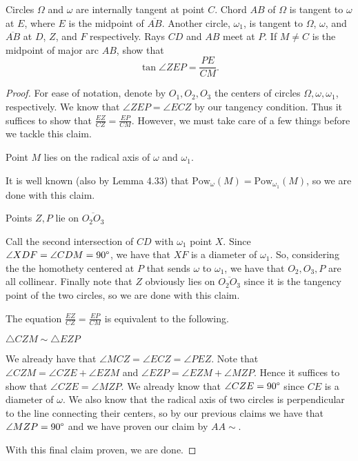 \documentclass[letterpaper,oneside]{scrartcl}
\providecommand{\ol}{\overline}
\begin{document}
\begin{problem*}
  Circles $\Omega$ and $\omega$ are internally tangent at point $C$. Chord $AB$ of $\Omega$ is tangent to $\omega$ at $E$, where $E$ is the midpoint of $\overline{AB}$. Another circle, $\omega_1$, is tangent to $\Omega$, $\omega$, and $\overline{AB}$ at $D$, $Z$, and $F$ respectively. Rays $CD$ and $AB$ meet at $P$. If $M\ne C$ is the midpoint of major arc $AB$, show that$$\tan\angle ZEP=\frac{PE}{CM}.$$
\end{problem*}
\newpage
\begin{proof}
  For ease of notation, denote by \(O_1,O_2,O_3\) the centers of circles \(\Omega,\omega,\omega_1\), respectively. We know that \(\angle ZEP = \angle ECZ\) by our tangency condition. Thus it suffices to show that \(\frac{EZ}{CZ} = \frac{EP}{CM}\). However, we must take care of a few things before we tackle this claim.
  \begin{claim*}
    Point \(M\) lies on the radical axis of \(\omega\) and \(\omega_1\).
  \end{claim*}
  \begin{subproof}
    It is well known (also by Lemma 4.33) that \(\text{Pow}_\omega(M) = \text{Pow}_{\omega_1}(M)\), so we are done with this claim.
  \end{subproof}
  \begin{claim*}
    Points \(Z,P\) lie on \(\ol{O_2O_3}\)
  \end{claim*}
  \begin{subproof}
    Call the second intersection of \(CD\) with \(\omega_1\) point \(X\). Since \(\angle XDF = \angle CDM = 90\degree\), we have that \(XF\) is a diameter of \(\omega_1\). So, considering the the homothety centered at \(P\) that sends \(\omega\) to \(\omega_1\), we have that \(O_2,O_3,P\) are all collinear. Finally note that \(Z\) obviously lies on \(\ol{O_2O_3}\) since it is the tangency point of the two circles, so we are done with this claim.
  \end{subproof}
  The equation \(\frac{EZ}{CZ} = \frac{EP}{CM}\) is equivalent to the following.
  \begin{claim*}
    \(\triangle CZM \sim \triangle EZP\)
  \end{claim*}
  \begin{subproof}
    We already have that \(\angle MCZ = \angle ECZ = \angle PEZ\). Note that \(\angle CZM = \angle CZE + \angle EZM\) and \(\angle EZP = \angle EZM + \angle MZP\). Hence it suffices to show that \(\angle CZE = \angle MZP\). We already know that \(\angle CZE = 90\degree\) since \(CE\) is a diameter of \(\omega\). We also know that the radical axis of two circles is perpendicular to the line connecting their centers, so by our previous claims we have that \(\angle MZP = 90\degree\) and we have proven our claim by \(AA\sim\).
  \end{subproof}
  With this final claim proven, we are done.
\end{proof}
\end{document}
